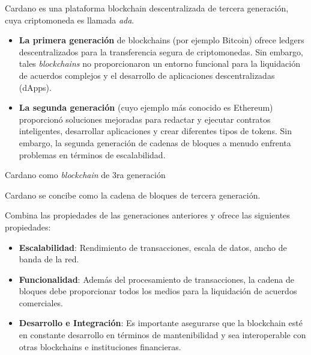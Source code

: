 \documentclass{beamer}
\begin{document}
\begin{frame}
Cardano es una plataforma blockchain descentralizada de tercera generación, cuya criptomoneda es llamada \textit{ada}. 

\pause

\begin{itemize}
    \item \textbf{La primera generación} de blockchains (por ejemplo Bitcoin) ofrece ledgers descentralizados para la transferencia segura de criptomonedas. \pause Sin embargo, tales \textit{blockchains} no proporcionaron un entorno funcional para la liquidación de acuerdos complejos y el desarrollo de aplicaciones descentralizadas (dApps). 
    \pause

    \item \textbf{La segunda generación} (cuyo ejemplo más conocido es Ethereum) proporcionó soluciones mejoradas para redactar y ejecutar contratos inteligentes, desarrollar aplicaciones y crear diferentes tipos de tokens. \pause Sin embargo, la segunda generación de cadenas de bloques a menudo enfrenta problemas en términos de escalabilidad.
\end{itemize}
\end{frame}

\begin{frame}{Cardano como \textit{blockchain} de 3ra generación}

Cardano se concibe como la cadena de bloques de tercera generación.

Combina las propiedades de las generaciones anteriores y ofrece las siguientes propiedades:
\pause

\begin{itemize}
    \item \textbf{Escalabilidad}: Rendimiento de transacciones, escala de datos, ancho de banda de la red.
        \pause
    \item \textbf{Funcionalidad}: Además del procesamiento de transacciones, la cadena de bloques debe proporcionar todos los medios para la liquidación de acuerdos comerciales. 
        \pause
    \item \textbf{Desarrollo e Integración}: Es importante asegurarse que la blockchain esté en constante desarrollo en términos de mantenibilidad y sea interoperable con otras blockchains e instituciones financieras.
\end{itemize} 

\end{frame}
\end{document}
